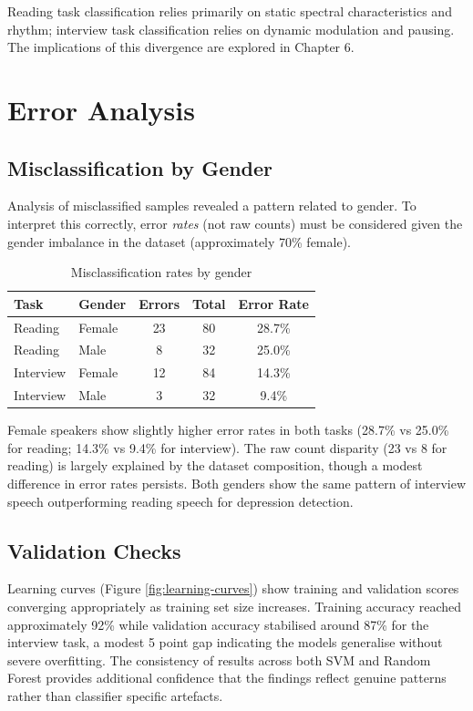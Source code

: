 Reading task classification relies primarily on static spectral characteristics and rhythm; interview task classification relies on dynamic modulation and pausing. The implications of this divergence are explored in Chapter 6.

\section{Error Analysis}

\subsection{Misclassification by Gender}

Analysis of misclassified samples revealed a pattern related to gender. To interpret this correctly, error \textit{rates} (not raw counts) must be considered given the gender imbalance in the dataset (approximately 70\% female).

\begin{table}[h]
\centering
\caption{Misclassification rates by gender}
\label{tab:error-gender}
\begin{tabular}{llccc}
\hline
\textbf{Task} & \textbf{Gender} & \textbf{Errors} & \textbf{Total} & \textbf{Error Rate} \\
\hline
Reading & Female & 23 & 80 & 28.7\% \\
Reading & Male & 8 & 32 & 25.0\% \\
Interview & Female & 12 & 84 & 14.3\% \\
Interview & Male & 3 & 32 & 9.4\% \\
\hline
\end{tabular}
\end{table}

Female speakers show slightly higher error rates in both tasks (28.7\% vs 25.0\% for reading; 14.3\% vs 9.4\% for interview). The raw count disparity (23 vs 8 for reading) is largely explained by the dataset composition, though a modest difference in error rates persists. Both genders show the same pattern of interview speech outperforming reading speech for depression detection.

\subsection{Validation Checks}

Learning curves (Figure \ref{fig:learning-curves}) show training and validation scores converging appropriately as training set size increases. Training accuracy reached approximately 92\% while validation accuracy stabilised around 87\% for the interview task, a modest 5 point gap indicating the models generalise without severe overfitting. The consistency of results across both SVM and Random Forest provides additional confidence that the findings reflect genuine patterns rather than classifier specific artefacts.

